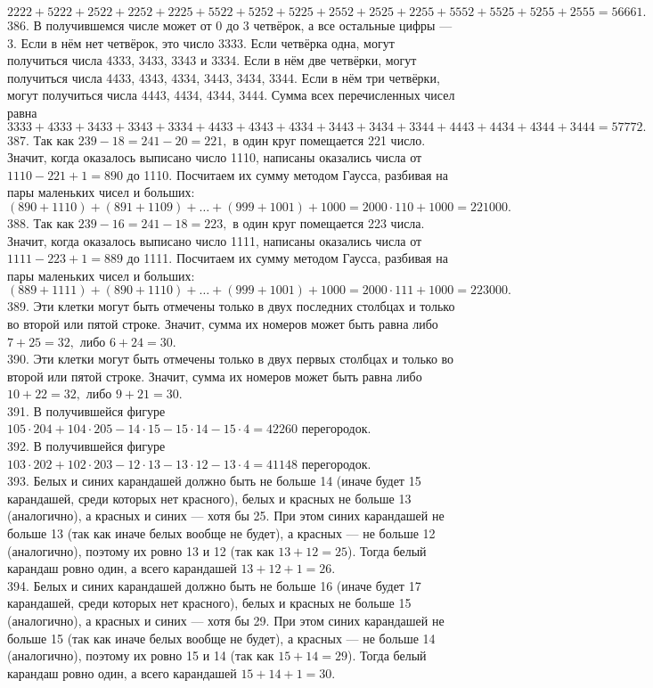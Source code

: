 $2222+5222+2522+2252+2225+5522+5252+5225+2552+2525+2255+5552+5525+5255+2555=
56661.$\\
386. В получившемся числе может от 0 до 3 четвёрок, а все остальные цифры --- 3. Если в нём нет четвёрок, это число 3333. Если четвёрка одна, могут получиться числа 4333, 3433, 3343 и 3334. Если в нём две четвёрки, могут получиться числа 4433, 4343, 4334, 3443, 3434, 3344. Если в нём три четвёрки, могут получиться числа 4443, 4434, 4344, 3444. Сумма всех перечисленных чисел равна
$3333+4333+3433+3343+3334+4433+4343+4334+3443+3434+3344+4443+4434+4344+3444=
57772.$\\
387. Так как $239-18=241-20=221,$ в один круг помещается 221 число. Значит, когда оказалось выписано число 1110, написаны оказались числа от $1110-221+1=890$ до 1110. Посчитаем их сумму методом Гаусса, разбивая на пары маленьких чисел и больших: $(890+1110)+(891+1109)+\ldots+(999+1001)+1000=
2000\cdot110+1000=221000.$\\
388. Так как $239-16=241-18=223,$ в один круг помещается 223 числа. Значит, когда оказалось выписано число 1111, написаны оказались числа от $1111-223+1=889$ до 1111. Посчитаем их сумму методом Гаусса, разбивая на пары маленьких чисел и больших: $(889+1111)+(890+1110)+\ldots+(999+1001)+1000=
2000\cdot111+1000=223000.$\\
389. Эти клетки могут быть отмечены только в двух последних столбцах и только во второй или пятой строке. Значит, сумма их номеров может быть равна либо $7+25=32,$ либо $6+24=30.$\\
390. Эти клетки могут быть отмечены только в двух первых столбцах и только во второй или пятой строке. Значит, сумма их номеров может быть равна либо $10+22=32,$ либо $9+21=30.$\\
391. В получившейся фигуре $105\cdot204+104\cdot205-14\cdot15-15\cdot14-15\cdot4=42260$ перегородок.\\
392. В получившейся фигуре $103\cdot202+102\cdot203-12\cdot13-13\cdot12-13\cdot4=41148$ перегородок.\\
393. Белых и синих карандашей должно быть не больше 14 (иначе будет 15 карандашей, среди которых нет красного), белых и красных не больше 13 (аналогично), а красных и синих --- хотя бы 25. При этом синих карандашей не больше 13 (так как иначе белых вообще не будет), а красных --- не больше 12 (аналогично), поэтому их ровно 13 и 12 (так как $13+12=25$). Тогда белый карандаш ровно один, а всего карандашей $13+12+1=26.$\\
394. Белых и синих карандашей должно быть не больше 16 (иначе будет 17 карандашей, среди которых нет красного), белых и красных не больше 15 (аналогично), а красных и синих --- хотя бы 29. При этом синих карандашей не больше 15 (так как иначе белых вообще не будет), а красных --- не больше 14 (аналогично), поэтому их ровно 15 и 14 (так как $15+14=29$). Тогда белый карандаш ровно один, а всего карандашей $15+14+1=30.$\\
